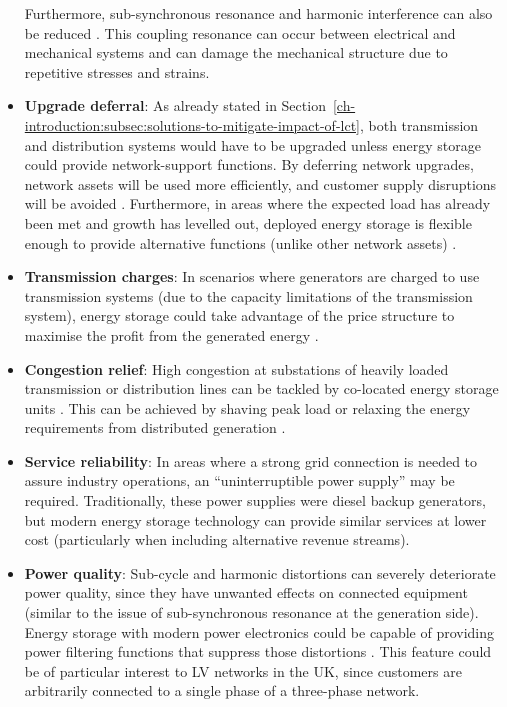 \begin{itemize}
Furthermore, sub-synchronous resonance and harmonic interference can also be reduced \cite{Wang1994}.
This coupling resonance can occur between electrical and mechanical systems and can damage the mechanical structure due to repetitive stresses and strains.
\item
\textbf{Upgrade deferral}: As already stated in Section~\ref{ch-introduction:subsec:solutions-to-mitigate-impact-of-lct}, both transmission and distribution systems would have to be upgraded unless energy storage could provide network-support functions.
By deferring network upgrades, network assets will be used more efficiently, and customer supply disruptions will be avoided \cite{Sayer2007, Eyer2010a}.
Furthermore, in areas where the expected load has already been met and growth has levelled out, deployed energy storage is flexible enough to provide alternative functions (unlike other network assets) \cite{Huff2013}.
\item
\textbf{Transmission charges}: In scenarios where generators are charged to use transmission systems (due to the capacity limitations of the transmission system), energy storage could take advantage of the price structure to maximise the profit from the generated energy \cite{Sayer2007, Leou2012}.
\item
\textbf{Congestion relief}: High congestion at substations of heavily loaded transmission or distribution lines can be tackled by co-located energy storage units \cite{Saez-de-Ibarra2013a, Kulkarni2005}.
This can be achieved by  shaving peak load or relaxing the energy requirements from distributed generation \cite{Reihani2016, Gerards2016d}.
\item
\textbf{Service reliability}: In areas where a strong grid connection is needed to assure  industry operations, an ``uninterruptible power supply'' may be required.
Traditionally, these power supplies were diesel backup generators, but modern energy storage technology can provide similar services at lower cost \cite{Schoenung2001} (particularly when including alternative revenue streams).
\item
\textbf{Power quality}: Sub-cycle and harmonic distortions can severely deteriorate power quality, since they have unwanted effects on connected equipment (similar to the issue of sub-synchronous resonance at the generation side).
Energy storage with modern power electronics could be capable of providing power filtering functions that suppress those distortions \cite{Putrus2007}.
This feature could be of particular interest to LV networks in the UK, since customers are arbitrarily connected to a single phase of a three-phase network.

\end{itemize}
